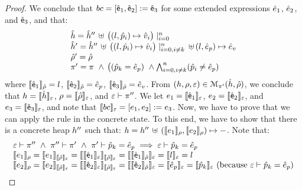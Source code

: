 \begin{proof}
\noindent{}
We conclude that  $\bcmd = [\pvsexpr_1, \pvsexpr_2] := \pvsexpr_3$ for some extended expressions $\sexpr_1$, $\sexpr_2$, 
and $\pvsexpr_3$, and that: 
$$
\begin{array}{l}
  \sheap =  \sheap'' \, \uplus \, \big((l, \sexprp_i) \mapsto \sexprv_i\big)\mid_{i = 0}^n    \\
  \sheap' = \sheap'' \, \uplus \,  \big((l, \sexprp_i) \mapsto \sexprv_i\big)\mid_{i = 0, i \neq k}^n \, \uplus \,  (l, \sexpr_p) \mapsto \sexpr_v  \\
  \sstore' = \sstore \\ 
  \pc' = \pc \ \wedge \, \big( (\sexprp_k = \sexpr_p) \ \wedge \bigwedge_{i = 0, i \neq k}^n (\sexprp_i \neq \sexpr_p)
\end{array}
$$ 
where $\symbeval{\pvsexpr_1}{\sstore} =  \loc$, $\symbeval{\pvsexpr_2}{\sstore} =  \sexpr_p$, 
$\symbeval{\pvsexpr_3}{\sstore} =  \sexpr_v$.
From $(\heap, \store, \senv) \in \smodels{\sheap, \sstore}{\pc'}$, we conclude that $\heap = \semexpr{\sheap}{\senv}$, $\store = \semexpr{\sstore}{\senv}$, and 
$\senv \vdash \pc''$. 
We let $\jsilexpr_1 = \symbeval{\pvsexpr_1}{\senv}$, 
$\jsilexpr_2 = \symbeval{\pvsexpr_2}{\senv}$, and $\jsilexpr_3 = \symbeval{\pvsexpr_3}{\senv}$, and note that $\symbeval{\bcmd}{\senv} = [\jsilexpr_1, \jsilexpr_2] := \jsilexpr_3$.
Now, we have to prove that we can apply the  rule in the concrete state.
To this end, we have to show that there is a concrete heap $\heap''$ such that:
$\heap = \heap'' \dunion \hcell{\symbeval{\jsilexpr_1}{\store}}{\symbeval{\jsilexpr_2}{\store}}{-}$. 
Note that: 
$$
\begin{array}{l}
%
\senv \vdash \pc'' \ \wedge \ \pc'' \vdash \pc' \ \wedge \ \pc' \vdash \sexprp_k = \sexpr_p \implies \senv \vdash \sexprp_k = \sexpr_p \\
%
 \symbeval{\jsilexpr_1}{\store} = \symbeval{\jsilexpr_1}{\symbeval{\sstore}{\senv}} = \symbeval{\symbeval{\pvsexpr_1}{\senv}}{\symbeval{\sstore}{\senv}} = \symbeval{\symbeval{\pvsexpr_1}{\sstore}}{\senv} 
    = \symbeval{\loc}{\senv} = \loc \\ 
  \symbeval{\jsilexpr_2}{\store}  = \symbeval{\jsilexpr_2}{\semexpr{\sstore}{\senv}} =  \symbeval{\symbeval{\pvsexpr_2}{\senv}}{\symbeval{\sstore}{\senv}} = \symbeval{\symbeval{\pvsexpr_2}{\sstore}}{\senv}
   =  \symbeval{\sexpr_p}{\senv} = \symbeval{\sexprp_k}{\senv}  \text{ (because $\senv \vdash \sexprp_k = \sexpr_p$)} \\

\end{array}$$
\end{proof}
